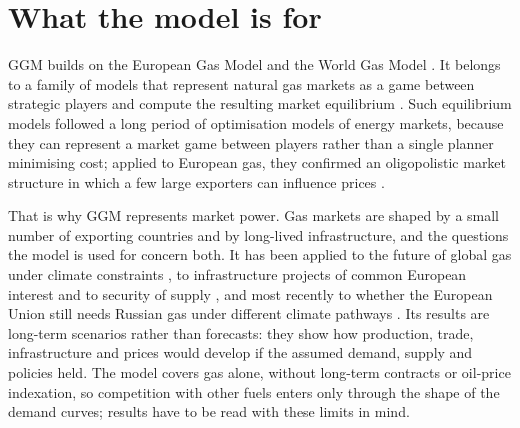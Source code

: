 \section{What the model is for}

GGM builds on the European Gas Model and the World Gas Model \citep[p.~8]{egging2019global}.
It belongs to a family of models that represent natural gas markets as a game between strategic players and compute the resulting market equilibrium \citep{gabriel2005mixed, egging2008complementarity, egging2010world}.
Such equilibrium models followed a long period of optimisation models of energy markets, because they can represent a market game between players rather than a single planner minimising cost; applied to European gas, they confirmed an oligopolistic market structure in which a few large exporters can influence prices \citep{holz2015modeling, holz2008strategic}.

That is why GGM represents market power.
Gas markets are shaped by a small number of exporting countries and by long-lived infrastructure, and the questions the model is used for concern both.
It has been applied to the future of global gas under climate constraints \citep{holz2015global}, to infrastructure projects of common European interest and to security of supply \citep[p.~8]{egging2019global}, and most recently to whether the European Union still needs Russian gas under different climate pathways \citep{barner2025russian, holz2024diw}.
Its results are long-term scenarios rather than forecasts: they show how production, trade, infrastructure and prices would develop if the assumed demand, supply and policies held.
The model covers gas alone, without long-term contracts or oil-price indexation, so competition with other fuels enters only through the shape of the demand curves; results have to be read with these limits in mind.
